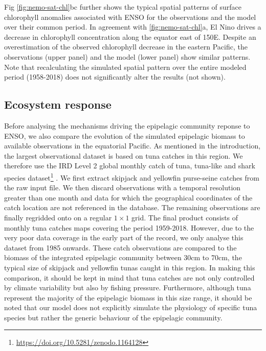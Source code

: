 Fig \ref{fig:nemo-sat-chl}bc further shows the typical spatial patterns of surface chlorophyll anomalies associated with ENSO for the observations and the model over their common period. In agreement with \ref{fig:nemo-sat-chl}a, El Nino drives a decrease in chlorophyll concentration along the equator east of 150\degree{}E. Despite an overestimation of the observed chlorophyll decrease in the eastern Pacific, the observations (upper panel) and the model (lower panel) show similar patterns. Note that recalculating the simulated spatial pattern over the entire modeled period (1958-2018) does not significantly alter the results (not shown). 

\subsection{Ecosystem response}

Before analysing the mechanisms driving the epipelagic community reponse to ENSO, we also compare the evolution of the simulated epipelagic biomass to available observations in the equatorial Pacific. As mentioned in the introduction, the largest observational dataset is based on tuna catches in this region. We therefore use the IRD Level 2 global monthly catch of tuna, tuna-like and shark species dataset\footnote{\url{https://doi.org/10.5281/zenodo.1164128}} \citep{taconetGlobalMonthlyCatch2018}. We first extract skipjack and yellowfin purse-seine catches from the raw input file. We then discard observations with a temporal resolution greater than one month and data for which the geographical coordinates of the catch location are not referenced in the database. The remaining observations are finally regridded onto on a regular $1 \times 1$ grid. The final product consists of monthly tuna catches maps  covering the period 1959-2018. However, due to the very poor data coverage in the early part of the record, we only analyse this dataset from 1985 onwards. These catch observations are compared to the biomass of the integrated epipelagic community between 30cm to 70cm, the typical size of  skipjack and yellowfin tunas caught in this region. In making this comparison, it should be kept in mind that tuna catches are not only controlled by climate variability but also by fishing pressure. Furthermore, although tuna represent the majority of the epipelagic biomass in this size range, it should be noted that our model does not explicitly simulate the physiology of specific tuna species but rather the generic behaviour of the epipelagic community.

